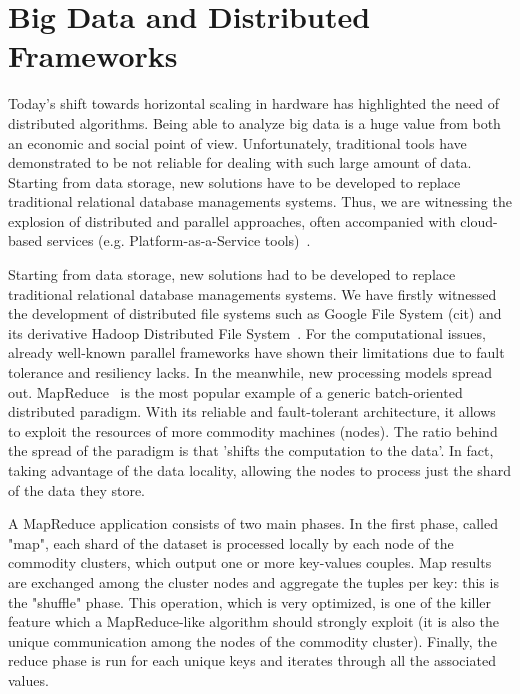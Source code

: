 


\section{Big Data and Distributed Frameworks}
Today's shift towards horizontal scaling in hardware has highlighted the
need of distributed algorithms. Being able to analyze big data is a huge value from both an economic and social point of view. Unfortunately, traditional tools have demonstrated to be not reliable for dealing with such large amount of data.
Starting from data storage, new solutions have to be developed to replace traditional relational database managements systems. 
 Thus, we
are witnessing the explosion of distributed and parallel approaches, often
accompanied with cloud-based services (e.g. Platform-as-a-Service
tools)~\cite{ApilettiBCCG13}.

Starting from data storage, new solutions had to be developed to replace traditional relational database managements systems. We have firstly witnessed the development of distributed file systems such as Google File System (cit) and its derivative Hadoop Distributed File System~\cite{HDFS}. For the computational issues, already well-known parallel frameworks have shown their limitations due to fault tolerance and resiliency lacks. In the meanwhile, new processing models spread out. 
MapReduce~\cite{ArticoloMapReduceGoogle} is the most popular example of a generic batch-oriented distributed paradigm. With its reliable and fault-tolerant architecture, it allows to exploit the resources of more commodity machines (nodes). The ratio behind the spread of the paradigm is that 'shifts the computation to the data'.
In fact, taking advantage of the data locality, allowing the nodes to process just the shard of the data they store.

A MapReduce application consists of two main phases. In the first phase, called "map", each shard of the dataset is processed locally by each node of the commodity clusters, which output one or more key-values couples. Map results are exchanged among the cluster nodes and aggregate the tuples per key: this is the "shuffle" phase. This operation, which is very optimized, is one of the killer feature which a MapReduce-like algorithm should strongly exploit (it is also the unique communication among the nodes of the commodity cluster). Finally, the reduce phase is run for each unique keys and iterates through all the associated values.

